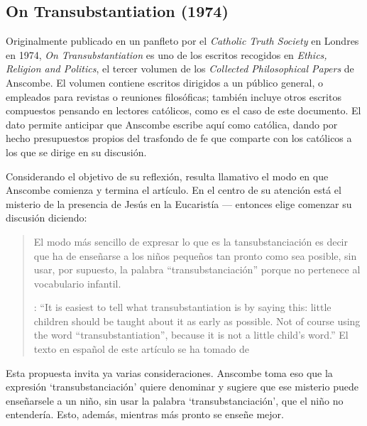 \subsection{On Transubstantiation (1974)}

Originalmente publicado en un panfleto por el \emph{Catholic Truth Society} en Londres en 1974, \emph{On Transubstantiation} es uno de los escritos recogidos en \emph{Ethics, Religion and Politics}, el tercer volumen de los \emph{Collected Philosophical Papers} de Anscombe. El volumen contiene escritos dirigidos a un público general, o empleados para revistas o reuniones filosóficas; también incluye otros escritos compuestos pensando en lectores católicos, como es el caso de este documento. El dato permite anticipar que Anscombe escribe aquí como católica, dando por hecho presupuestos propios del trasfondo de fe que comparte con los católicos a los que se dirige en su discusión.

Considerando el objetivo de su reflexión, resulta llamativo el modo en que Anscombe comienza y termina el artículo. En el centro de su atención está el misterio de la presencia de Jesús en la Eucaristía --- entonces elige comenzar su discusión diciendo: \blockquote[{\cite[108]{anscombe1981erp:ot}}: \enquote{It is easiest to tell what transubstantiation is by saying this: little children should be taught about it as early as possible. Not of course using the word ``transubstantiation'', because it is not a little child's word.} El texto en español de este artículo se ha tomado de {\cite{torralbaynubiola2005fayeh:ot}}]{El modo más sencillo de expresar lo que es la tansubstanciación es decir que ha de enseñarse a los niños pequeños tan pronto como sea posible, sin usar, por supuesto, la palabra ``transubstanciación'' porque no pertenece al vocabulario infantil.} Esta propuesta invita ya varias consideraciones. Anscombe toma eso que la expresión `transubstanciación' quiere denominar y sugiere que ese misterio puede enseñarsele a un niño, sin usar la palabra `transubstanciación', que el niño no entendería. Esto, además, mientras más pronto se enseñe mejor.

